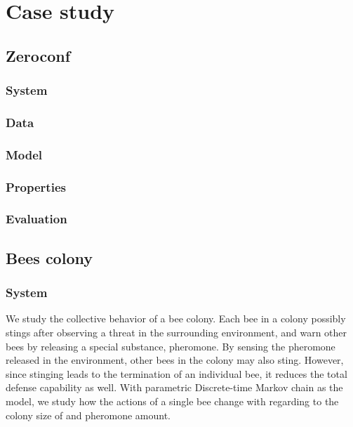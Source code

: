 \chapter{Case study}
\section{Zeroconf}
\subsection{System}
\subsection{Data}
\subsection{Model}
\subsection{Properties}
\subsection{Evaluation}

\section{Bees colony}
\subsection{System}
We study the collective behavior of a bee colony. Each bee in a colony
possibly stings after observing a threat in the surrounding environment, and
warn other bees by releasing a special substance, pheromone. By sensing the
pheromone released in the environment, other bees in the colony may also
sting. However, since stinging leads to the termination of an individual bee,
it reduces the total defense capability as well. With parametric Discrete-time
Markov chain as the model, we study how the actions of a single bee change
with regarding to the colony size of and pheromone amount. 

